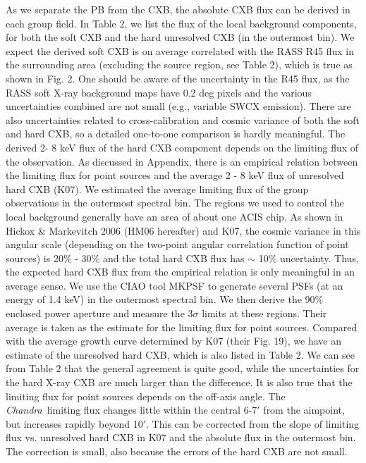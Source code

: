 \documentclass{aastex}
\def\chandra    {{\em Chandra}\/}
\begin{document}
As we separate the PB from the CXB, the absolute CXB flux can be
derived in each group field. In Table 2, we list the flux of the local background
components, for both the soft CXB and the hard unresolved CXB (in the outermost bin).
We expect the derived soft CXB is on average
correlated with the RASS R45 flux in the surrounding area (excluding the source region,
see Table 2), which is true as shown in Fig. 2.
One should be aware of the uncertainty in the R45 flux, as the RASS soft X-ray background
maps have 0.2 deg pixels and the various uncertainties combined are not small (e.g.,
variable SWCX emission).
There are also uncertainties related to cross-calibration and
cosmic variance of both the soft and hard CXB, so a detailed one-to-one comparison
is hardly meaningful.
The derived 2- 8 keV flux of the hard CXB component depends on the limiting flux
of the observation. As discussed in Appendix, there is an empirical
relation between the limiting flux for point sources and the average
2 - 8 keV flux of unresolved hard CXB (K07). We estimated the average limiting flux
of the group observations in the outermost spectral bin.
The regions we used to control the local background generally have an area of about one ACIS
chip. As shown in Hickox \& Markevitch 2006 (HM06 hereafter) and K07, the cosmic
variance in this angular scale (depending
on the two-point angular correlation function of point sources) is 20\% - 30\% and
the total hard CXB flux has $\sim$ 10\% uncertainty. Thus, the expected hard CXB flux
from the empirical relation is only meaningful in an average sense. We use the CIAO
tool MKPSF to generate several PSFs (at an energy of 1.4 keV) in the outermost
spectral bin. We then derive the 90\% enclosed power aperture and measure the 3$\sigma$
limits at these regions. Their average is taken as the estimate for the limiting flux
for point sources. Compared with the average growth curve determined by K07 (their Fig. 19), we have an estimate of the unresolved hard CXB, which is also listed in Table 2.
We can see from Table 2 that the general agreement is quite good, while the
uncertainties for the hard X-ray CXB are much larger than the difference.
It is also true that the limiting flux for point sources depends on the off-axis angle.
The \chandra\ limiting flux changes little within the central 6-7$'$ from the
aimpoint, but increases rapidly beyond 10$'$. This can be corrected from the slope
of limiting flux vs. unresolved hard CXB in K07 and the absolute flux in the
outermost bin. The correction is small, also because the errors of the hard CXB are not small.
\end{document}
